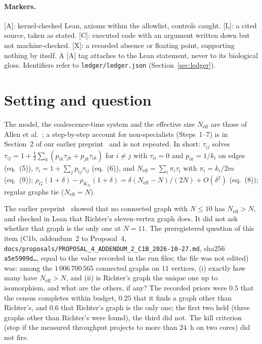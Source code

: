 \documentclass[10pt]{article}
\newcommand{\tier}[1]{\textsf{[#1]}}
\newcommand{\tA}{\tier{A}}
\newcommand{\tL}{\tier{L}}
\newcommand{\tC}{\tier{C}}
\newcommand{\tX}{\tier{X}}
\newcommand{\Neff}{N_{\mathrm{eff}}}
\begin{document}
\paragraph{Markers.} \tA{}: kernel-checked Lean, axioms within the allowlist, controls caught. \tL{}: a cited source, taken as stated. \tC{}: executed code with an argument written down but not machine-checked. \tX{}: a recorded absence or floating point, supporting nothing by itself. A \tA{} tag attaches to the Lean statement, never to its biological gloss. Identifiers refer to \texttt{ledger/ledger.json} (Section~\ref{sec:ledger}).

\section{Setting and question}\label{sec:setting}
The model, the coalescence-time system and the effective size $\Neff$ are those of Allen et al.~\cite{allen}; a step-by-step account for non-specialists (Steps~1--7) is in Section~2 of our earlier preprint~\cite{c1} and is not repeated.
In short: $\tau_{ij}$ solves $\tau_{ij}=1+\tfrac12\sum_k(p_{ik}\tau_{jk}+p_{jk}\tau_{ik})$ for $i\ne j$ with $\tau_{ii}=0$ and $p_{ik}=1/k_i$ on edges (eq.~(5)), $\tau_i=1+\sum_jp_{ij}\tau_{ij}$ (eq.~(6)), and $\Neff=\sum_i\pi_i\tau_i$ with $\pi_i=k_i/2m$ (eq.~(9)); $\rho_G(1+\delta)-\rho_{K_N}(1+\delta)=\delta(\Neff-N)/(2N)+O(\delta^2)$ (eq.~(8)); regular graphs tie ($\Neff=N$).

The earlier preprint~\cite{c1} showed that no connected graph with $N\le10$ has $\Neff>N$, and checked in Lean that Richter's eleven-vertex graph does. It did not ask whether that graph is the only one at $N=11$. The preregistered question of this item (C1b, addendum~2 to Proposal~4, \texttt{docs/proposals/PROPOSAL\_4\_ADDENDUM\_2\_C1B\_2026-10-27.md}, sha256 \texttt{a5e5909d\dots}, equal to the value recorded in the run files; the file was not edited) was: among the $1\,006\,700\,565$ connected graphs on $11$ vertices, (i) exactly how many have $\Neff>N$, and (ii) is Richter's graph the unique one up to isomorphism, and what are the others, if any? The recorded priors were $0.5$ that the census completes within budget, $0.25$ that it finds a graph other than Richter's, and $0.6$ that Richter's graph is the only one; the first two held (three graphs other than Richter's were found), the third did not. The kill criterion (stop if the measured throughput projects to more than $24$~h on two cores) did not fire.
\end{document}
